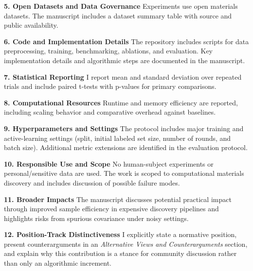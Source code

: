\documentclass[conference]{IEEEtran}
\begin{document}
\textbf{5. Open Datasets and Data Governance}
Experiments use open materials datasets. The manuscript includes a dataset summary table with source and public availability.

\textbf{6. Code and Implementation Details}
The repository includes scripts for data preprocessing, training, benchmarking, ablations, and evaluation. Key implementation details and algorithmic steps are documented in the manuscript.

\textbf{7. Statistical Reporting}
I report mean and standard deviation over repeated trials and include paired t-tests with p-values for primary comparisons.

\textbf{8. Computational Resources}
Runtime and memory efficiency are reported, including scaling behavior and comparative overhead against baselines.

\textbf{9. Hyperparameters and Settings}
The protocol includes major training and active-learning settings (split, initial labeled set size, number of rounds, and batch size). Additional metric extensions are identified in the evaluation protocol.

\textbf{10. Responsible Use and Scope}
No human-subject experiments or personal/sensitive data are used. The work is scoped to computational materials discovery and includes discussion of possible failure modes.

\textbf{11. Broader Impacts}
The manuscript discusses potential practical impact through improved sample efficiency in expensive discovery pipelines and highlights risks from spurious covariance under noisy settings.

\textbf{12. Position-Track Distinctiveness}
I explicitly state a normative position, present counterarguments in an \textit{Alternative Views and Counterarguments} section, and explain why this contribution is a stance for community discussion rather than only an algorithmic increment.
\end{document}
